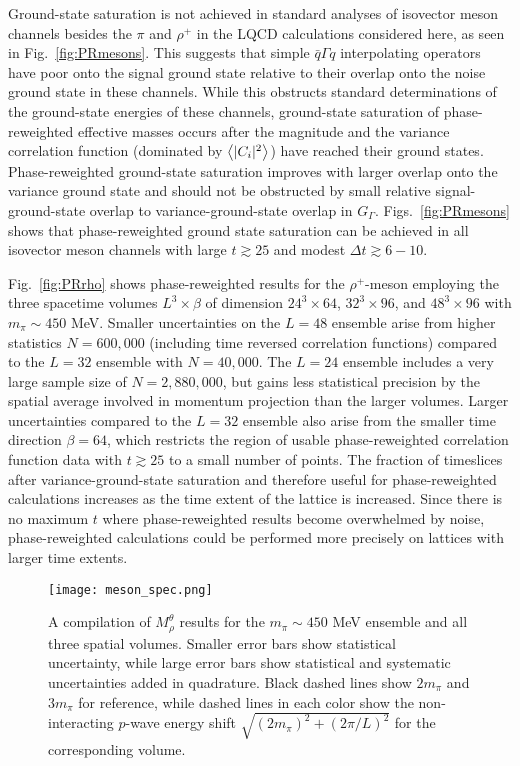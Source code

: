 Ground-state saturation is not achieved in standard analyses of isovector meson channels besides the $\pi$ and $\rho^+$ in the LQCD calculations considered here, as seen in Fig.~\ref{fig:PRmesons}.
This suggests that simple $\bar{q}\Gamma q$ interpolating operators have poor onto the signal ground state relative to their overlap onto the noise ground state in these channels.
While this obstructs standard determinations of the ground-state energies of these channels, ground-state saturation of phase-reweighted effective masses occurs after the magnitude and the variance correlation function (dominated by $\left< |C_i|^2 \right>$) have reached their ground states.
Phase-reweighted ground-state saturation improves with larger overlap onto the variance ground state and should not be obstructed by small relative signal-ground-state overlap to variance-ground-state overlap in $G_\Gamma$.
Figs.~\ref{fig:PRmesons} shows that phase-reweighted ground state saturation can be achieved in all isovector meson channels with large $t\gtrsim 25$ and modest $\Delta t \gtrsim 6 - 10$.

Fig.~\ref{fig:PRrho} shows phase-reweighted results for the $\rho^+$-meson employing the three spacetime volumes $L^3 \times \beta$ of dimension $24^3 \times 64$, $32^3\times 96$, and $48^3\times 96$ with $m_\pi \sim 450$ MeV.
Smaller uncertainties on the $L=48$ ensemble arise from higher statistics $N=600,000$ (including time reversed correlation functions) compared to the $L=32$ ensemble with $N=40,000$.
The $L=24$ ensemble includes a very large sample size of $N=2,880,000$, but
gains less statistical precision by the spatial average involved in momentum projection than the larger volumes.
Larger uncertainties compared to the $L=32$ ensemble also arise from the smaller time direction $\beta = 64$, which restricts the region of usable phase-reweighted correlation function data with $t\gtrsim 25$ to a small number of points.
The fraction of timeslices after variance-ground-state saturation and therefore useful for phase-reweighted calculations increases as the time extent of the lattice is increased.
Since there is no maximum $t$ where phase-reweighted results become overwhelmed by noise, phase-reweighted calculations could be performed more precisely on lattices with larger time extents.

\begin{figure}[!t]
  \centering
  \texttt{[image: meson\_spec.png]}
  \caption{A compilation of $M_\rho^\theta$ results for the $m_\pi \sim 450$ MeV ensemble and all three spatial volumes. Smaller error bars show statistical uncertainty, while large error bars show statistical and systematic uncertainties added in quadrature. Black dashed lines show $2m_\pi$ and $3m_\pi$ for reference, while dashed lines in each color show the non-interacting $p$-wave energy shift $\sqrt{(2m_\pi)^2 + (2\pi/L)^2}$ for the corresponding volume.}
  \label{fig:mesonspec}
\end{figure}

